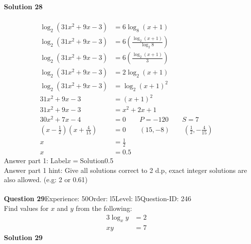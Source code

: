 \documentclass{article}
\begin{document}
\noindent\textbf{Solution 28}\\[2pt]
\\[-35pt]\begin{align*}
\log_{2}(31x^2+9x-3)&=6\log_{8}(x+1)\\[2pt]
\log_{2}(31x^2+9x-3)&=6\left(\displaystyle\frac{\log_{2}(x+1)}{\log_{2}8}\right)\\[2pt]
\log_{2}(31x^2+9x-3)&=6\left(\displaystyle\frac{\log_{2}(x+1)}{3}\right)\\[2pt]
\log_{2}(31x^2+9x-3)&=2\log_{2}(x+1)\\[2pt]
\log_{2}(31x^2+9x-3)&=\log_{2}(x+1)^2\\[2pt]
31x^2+9x-3&=(x+1)^2\\[2pt]
31x^2+9x-3&=x^2+2x+1\\[2pt]
30x^2+7x-4&=0\qquad P=-120 \qquad S=7\\[2pt]
\left(x-\displaystyle\frac{1}{2}\right)\left(x+\displaystyle\frac{4}{15}\right)&=0\qquad (15,-8)\qquad\left(\displaystyle\frac{1}{2},-\displaystyle\frac{4}{15}\right)\\[2pt]
x&=\displaystyle\frac{1}{2}\\[2pt]
x&=0.5
\end{align*}
Answer part 1: \hspace{10pt}Label\hspace{10pt}$x=$\hspace{10pt}Solution\hspace{10pt}0.5\\
Answer part 1 hint: \hspace{15pt}Give all solutions correct to 2 d.p, exact integer solutions are also allowed. (e.g: 2 or 0.61)\\
\\[4pt]
\noindent\textbf{Question 29}\hspace{20pt}Experience: 50\hspace{20pt}Order: l5\hspace{20pt}Level: l5\hspace{20pt}Question-ID: 246\\[2pt]
Find values for $x$ and $y$ from the following:
\begin{align*}
3\log_{x}y&=2\\[2pt]
xy&=7
\end{align*}
\noindent\textbf{Solution 29}\\[2pt]
\end{document}
